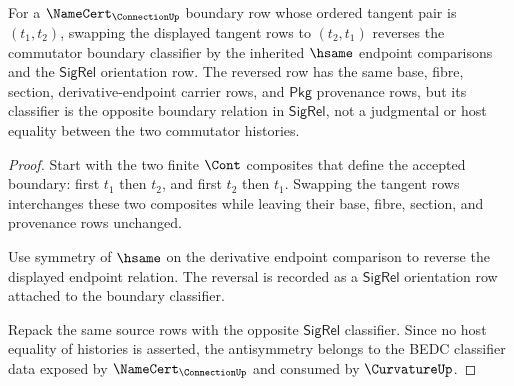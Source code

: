 \begin{theorem}
\label{thm:curvature-antisymmetric-boundary-classifier}
For a $\NameCert_{\ConnectionUp}$ boundary row whose ordered tangent pair is $(t_1,t_2)$, swapping the displayed tangent rows to $(t_2,t_1)$ reverses the commutator boundary classifier by the inherited $\hsame$ endpoint comparisons and the $\mathsf{SigRel}$ orientation row. The reversed row has the same base, fibre, section, derivative-endpoint carrier rows, and $\mathsf{Pkg}$ provenance rows, but its classifier is the opposite boundary relation in $\mathsf{SigRel}$, not a judgmental or host equality between the two commutator histories.
\end{theorem}
\begin{proof}
Start with the two finite $\Cont$ composites that define the accepted boundary: first $t_1$ then $t_2$, and first $t_2$ then $t_1$. Swapping the tangent rows interchanges these two composites while leaving their base, fibre, section, and provenance rows unchanged.

Use symmetry of $\hsame$ on the derivative endpoint comparison to reverse the displayed endpoint relation. The reversal is recorded as a $\mathsf{SigRel}$ orientation row attached to the boundary classifier.

Repack the same source rows with the opposite $\mathsf{SigRel}$ classifier. Since no host equality of histories is asserted, the antisymmetry belongs to the BEDC classifier data exposed by $\NameCert_{\ConnectionUp}$ and consumed by $\CurvatureUp$.
\end{proof}

